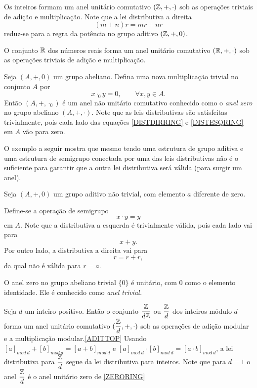       
      \begin{exmp}[Inteiros]
         Os inteiros formam um anel unitário comutativo $(\mathbb{Z} , + , \cdot)$ sob as operações triviais de adição e multiplicação. Note que a lei distributiva a direita $$(m + n)r = mr + nr$$ reduz-se para a regra da potência no grupo aditivo $(\mathbb{Z}, + , 0)$.
      \end{exmp}
      \begin{exmp}[Reais]
         O conjunto $\mathbb{R}$ dos números reais forma um anel unitário comutativo $(\mathbb{R}, +, \cdot)$ sob as operações triviais de adição e multiplicação.
      \end{exmp}
      \begin{exmp}
         Seja $(A, +, 0)$ um grupo abeliano. Defina uma nova multiplicação trivial no conjunto $A$ por $$ x \cdot_{0} y = 0, \quad \quad \forall x,y \in A.$$
         Então $(A, +, \cdot_{0})$ é um anel não unitário comutativo conhecido como o \emph{anel zero} no grupo abeliano $(A,+,\cdot)$. Note que as leis distributivas são satisfeitas trivialmente, pois cada lado das equações \ref{DISTDIRRING} e \ref{DISTESQRING} em $A$ vão para zero.
      \end{exmp}
      O exemplo a seguir mostra que mesmo tendo uma estrutura de grupo aditiva e uma estrutura de semigrupo conectada por uma das leis distributivas não é o suficiente para garantir que a outra lei distributiva será válida (para surgir um anel).
      \begin{exmp}
         Seja $(A,+,0)$ um grupo aditivo não trivial, com elemento $a$ diferente de zero.

         Define-se a operação de semigrupo $$x\cdot y = y$$ em $A$. Note que a distributiva a esquerda é trivialmente válida, pois cada lado vai para $$x + y.$$ Por outro lado, a distributiva a direita vai para $$r = r + r,$$ da qual não é válida para $r=a$.
      \end{exmp}
      \begin{exmp}\label{ZERORING}
         O anel zero no grupo abeliano trivial $\{0\}$ é unitário, com $0$ como o elemento identidade. Ele é conhecido como \emph{anel trivial.}
      \end{exmp}
      \begin{exmp}
         Seja $d$ um inteiro positivo. Então o conjunto $\dfrac{\mathbb{Z}}{d\mathbb{Z}}$ ou $\dfrac{\mathbb{Z}}{d}$ dos inteiros módulo $d$ forma um anel unitário comutativo $(\dfrac{\mathbb{Z}}{d}, + , \cdot)$ sob as operações de adição modular e a multiplicação modular.\ref{ADITTOP} Usando $[a]_{mod\ d} + [b]_{mod\ d} = [a+b]_{mod\ d}$ e $[a]_{mod\ d} \cdot [b]_{mod\ d} = [a\cdot b]_{mod\ d}$, a lei distributiva para $\dfrac{\mathbb{Z}}{d}$ segue da lei distributiva para inteiros. Note que para $d=1$ o anel $\dfrac{\mathbb{Z}}{d}$ é o anel unitário zero de \ref{ZERORING}
      \end{exmp}
